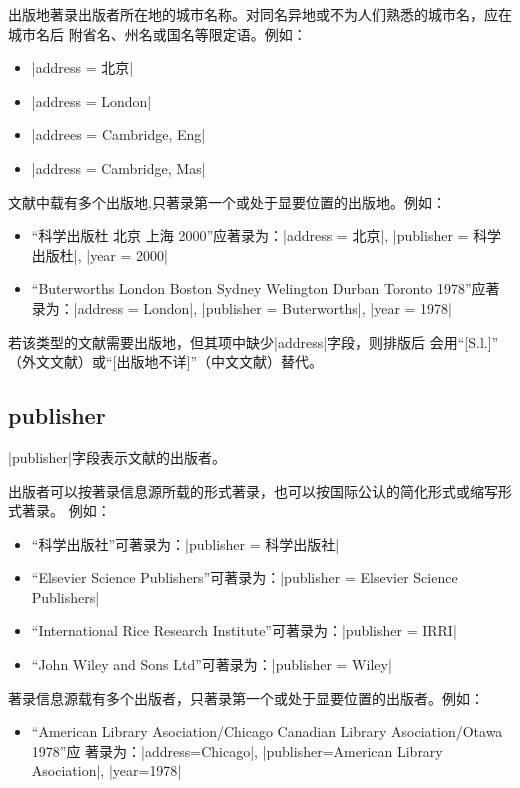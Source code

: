 出版地著录出版者所在地的城市名称。对同名异地或不为人们熟悉的城市名，应在城市名后
附省名、州名或国名等限定语。例如：
\begin{itemize}
\item |address = {北京}|
\item |address = {London}|
\item |addrees = {Cambridge, Eng}|
\item |address = {Cambridge, Mas}|
\end{itemize}

文献中载有多个出版地,只著录第一个或处于显要位置的出版地。例如：
\begin{itemize}
\item ``科学出版杜 北京 上海 2000''应著录为：|address = {北京}|, 
  |publisher = {科学出版杜}|, |year = {2000}|
\item ``Buterworths London Boston Sydney Welington Durban Toronto 1978''应著
  录为：|address = {London}|, |publisher = {Buterworths}|, |year = {1978}|
\end{itemize}

若该类型的文献需要出版地，但其{\BibTeX}项中缺少|address|字段，则{\BibTeX}排版后
会用``[S.l.]'' （外文文献）或``[出版地不详]''（中文文献）替代。

\subsection{publisher}\label{subsec:bibfield-publisher}

|publisher|字段表示文献的出版者。

出版者可以按著录信息源所载的形式著录，也可以按国际公认的简化形式或缩写形式著录。
例如：
\begin{itemize}
\item ``科学出版社''可著录为：|publisher = {科学出版社}|
\item ``Elsevier Science Publishers''可著录为：|publisher = {Elsevier Science Publishers}|
\item ``International Rice Research Institute''可著录为：|publisher = {IRRI}|
\item ``John Wiley and Sons Ltd''可著录为：|publisher = {Wiley}|
\end{itemize}

著录信息源载有多个出版者，只著录第一个或处于显要位置的出版者。例如：
\begin{itemize}
\item ``American Library Asociation/Chicago Canadian Library Asociation/Otawa 1978''应
    著录为：|address={Chicago}|, |publisher={American Library Asociation}|, |year={1978}|
\end{itemize}

